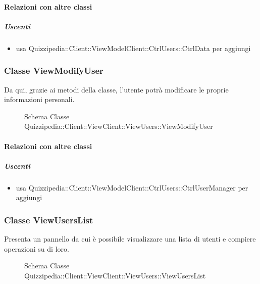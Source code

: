\paragraph{Relazioni con altre classi}
\subparagraph{Uscenti}
\begin{itemize}
\item usa Quizzipedia::Client::ViewModelClient::CtrlUsers::CtrlData per aggiungi
\end{itemize}
\subsubsection{Classe ViewModifyUser}
Da qui, grazie ai metodi della classe, l'utente potrà modificare le proprie informazioni personali.
\begin{figure}[H]
\centering
\noindent{}
\caption[Schema Classe ViewModifyUser]{Schema Classe Quizzipedia::Client::ViewClient::ViewUsers::ViewModifyUser}
\end{figure}
\paragraph{Relazioni con altre classi}
\subparagraph{Uscenti}
\begin{itemize}
\item usa Quizzipedia::Client::ViewModelClient::CtrlUsers::CtrlUserManager per aggiungi
\end{itemize}
\subsubsection{Classe ViewUsersList}
Presenta un pannello da cui è possibile visualizzare una lista di utenti e compiere operazioni su di loro.
\begin{figure}[H]
\centering
\noindent{}
\caption[Schema Classe ViewUsersList]{Schema Classe Quizzipedia::Client::ViewClient::ViewUsers::ViewUsersList}
\end{figure}
